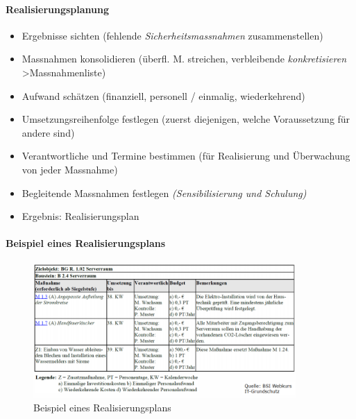 \documentclass[10pt,a4paper]{article}
\begin{document}
\paragraph*{Realisierungsplanung}
\begin{itemize}[noitemsep,topsep=0pt,leftmargin=*]
    \item Ergebnisse sichten (fehlende
    \textsl{Sicherheitsmassnahmen} zusammenstellen)
    \item Massnahmen konsolidieren (überfl. M. streichen,
    verbleibende \textsl{konkretisieren} \textgreater Massnahmenliste)
    \item Aufwand schätzen (finanziell, personell /
    einmalig, wiederkehrend)
    \item Umsetzungsreihenfolge festlegen (zuerst diejenigen, welche Voraussetzung für andere sind)
    \item Verantwortliche und Termine bestimmen (für
    Realisierung und Überwachung von jeder
    Massnahme)
    \item Begleitende Massnahmen festlegen
    \textsl{(Sensibilisierung und Schulung)}
    \item Ergebnis: Realisierungsplan
\end{itemize}

\paragraph*{Beispiel eines Realisierungsplans}
\begin{figure}[H]
    \begin{center}
    \includegraphics[width=10cm]{images/Beispiel eines Realisierungsplans.png}
    \caption{Beispiel eines Realisierungsplans}
    \label{Beispiel eines Realisierungsplans}
    \end{center}
\end{figure}
\end{document}

